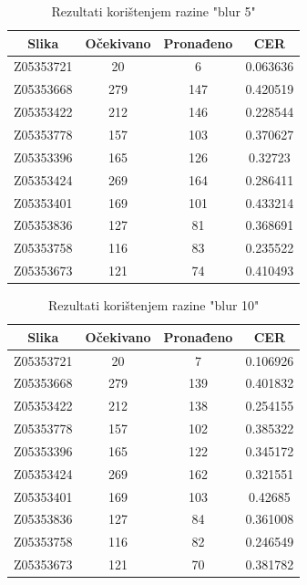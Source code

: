 \documentclass[times, utf8, zavrsni, numeric]{fer}
\begin{document}
\begin{table}[H]
	\caption{Rezultati korištenjem razine "blur 5"}
\label{tbl:Blur 2}
\centering
        \begin{tabular}{ |*{4}{c|} } \hline
	\multicolumn{1}{|c|}{Slika} & \multicolumn{1}{|c|}{Očekivano} & \multicolumn{1}{|c|}{Pronađeno} & \multicolumn{1}{|c|}{CER}\\ \hline
Z05353721&20&6&0.063636\\ \hline
Z05353668&279&147&0.420519\\ \hline
Z05353422&212&146&0.228544\\ \hline
Z05353778&157&103&0.370627\\ \hline
Z05353396&165&126&0.32723\\ \hline
Z05353424&269&164&0.286411\\ \hline
Z05353401&169&101&0.433214\\ \hline
Z05353836&127&81&0.368691\\ \hline
Z05353758&116&83&0.235522\\ \hline
Z05353673&121&74&0.410493\\ \hline
	\end{tabular}
\end{table}

\begin{table}[H]
	\caption{Rezultati korištenjem razine "blur 10"}
        \label{tbl:Blur 2}
        \centering
        \begin{tabular}{ |*{4}{c|} } \hline
	\multicolumn{1}{|c|}{Slika} & \multicolumn{1}{|c|}{Očekivano} & \multicolumn{1}{|c|}{Pronađeno} & \multicolumn{1}{|c|}{CER}\\ \hline
Z05353721&20&7&0.106926\\ \hline
Z05353668&279&139&0.401832\\ \hline
Z05353422&212&138&0.254155\\ \hline
Z05353778&157&102&0.385322\\ \hline
Z05353396&165&122&0.345172\\ \hline
Z05353424&269&162&0.321551\\ \hline
Z05353401&169&103&0.42685\\ \hline
Z05353836&127&84&0.361008\\ \hline
Z05353758&116&82&0.246549\\ \hline
Z05353673&121&70&0.381782\\ \hline
	\end{tabular}
\end{table}
\end{document}
